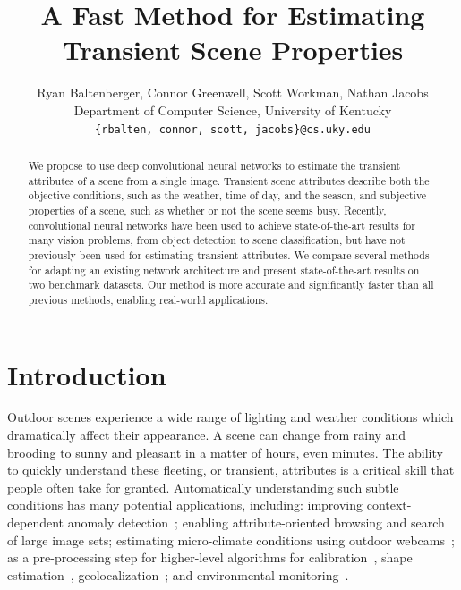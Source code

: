 \documentclass[10pt,twocolumn,letterpaper]{article}
\begin{document}
\title{A Fast Method for Estimating Transient Scene Properties}


\author{Ryan Baltenberger, Connor Greenwell, Scott Workman, Nathan Jacobs \\
  \vspace{-.75em} 
  Department of Computer Science, University of Kentucky \\
  {\tt\small \{rbalten, connor, scott, jacobs\}@cs.uky.edu}
}

\maketitle
\ifwacvfinal\thispagestyle{empty}\fi


\begin{abstract}

We propose to use deep convolutional neural networks to estimate the
transient attributes of a scene from a single image.  Transient scene
attributes describe both the objective conditions, such as the
weather, time of day, and the season, and subjective properties of a
scene, such as whether or not the scene seems busy. Recently,
convolutional neural networks have been used to achieve
state-of-the-art results for many vision problems, from object
detection to scene classification, but have not previously been used
for estimating transient attributes. We compare several methods for
adapting an existing network architecture and present state-of-the-art
results on two benchmark datasets. Our method is more accurate and
significantly faster than all previous methods, enabling real-world
applications. 

\end{abstract}

\section{Introduction}
Outdoor scenes experience a wide range of lighting and weather conditions which
dramatically affect their appearance. A scene can change from rainy and
brooding to sunny and pleasant in a matter of hours, even minutes. The ability
to quickly understand these fleeting, or transient, attributes is a critical
skill that people often take for granted. Automatically understanding such
subtle conditions has many potential applications, including: improving
context-dependent anomaly detection~\cite{abrams12lost}; enabling
attribute-oriented browsing and search of large image
sets\cite{jacobs07amos,skyfinder}; estimating micro-climate conditions using
outdoor webcams~\cite{islam13webcamweather}; as a pre-processing step for
higher-level algorithms for
calibration~\cite{jacobs13cloudcalibration,workman2014rainbow}, shape
estimation~\cite{heliometric,abramsheliometric},
geolocalization~\cite{jacobs07geolocate}; and  environmental
monitoring~\cite{jacobs09webcamgis}. 
\end{document}
